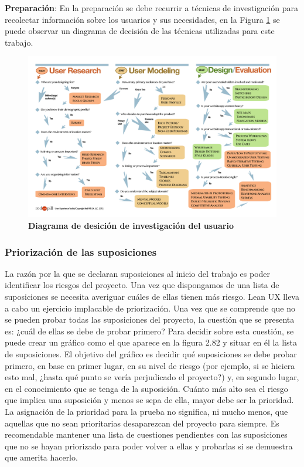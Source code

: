 \textbf{Preparación}: En la preparación se debe recurrir a técnicas de investigación para recolectar información sobre los usuarios y sus necesidades, en la Figura \ref{fig:diagrama-desicion} se puede observar un diagrama de decisión de las técnicas utilizadas para este trabajo.


\begin{figure}[h]
\includegraphics[width=16cm]{Img/CPD/3-FLOW.png}
\centering
\caption{\textbf{ \footnotesize{Diagrama de desición de investigación del usuario}}}
\label{fig:diagrama-desicion}
\end{figure}


\subsubsection{Priorización de las suposiciones} 
La razón por la que se declaran suposiciones al inicio del trabajo es poder identificar los riesgos del proyecto. Una vez que dispongamos de una lista de suposiciones se necesita averiguar cuáles de ellas tienen más riesgo. Lean UX lleva a cabo un ejercicio implacable de priorización. Una vez que se comprende que no se pueden probar todas las suposiciones del proyecto, la cuestión que se presenta es: ¿cuál de ellas se debe de probar primero? Para decidir sobre esta cuestión,  se puede crear un gráfico como el que aparece en la figura 2.82 y situar en él la lista de suposiciones. El objetivo del gráfico es decidir qué suposiciones se debe probar primero, en base en primer lugar, en su nivel de riesgo (por ejemplo, si se hiciera esto mal, ¿hasta qué punto se vería perjudicado el proyecto?) y, en segundo lugar, en el conocimiento que se tenga de la suposición. Cuánto más alto sea el riesgo que implica una suposición y menos se sepa de ella, mayor debe ser la prioridad. La asignación de la prioridad para la prueba no significa, ni mucho menos, que aquellas que no sean prioritarias desaparezcan del proyecto para siempre. Es recomendable mantener una lista de cuestiones pendientes con las suposiciones que no se hayan priorizado para poder volver a ellas y probarlas si se demuestra que amerita hacerlo.


